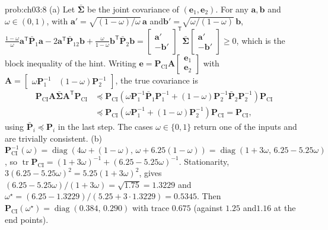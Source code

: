 \documentclass[graybox,envcountchap]{style/SNmono}
\DeclareMathOperator{\diag}{diag}
\DeclareMathOperator{\tr}{tr}
\providecommand{\DIFaddbegin}{} %
\providecommand{\DIFaddend}{} %
\begin{document}
\begin{sol}{prob:ch03:8}
(a) Let $\bar{\boldsymbol{\Sigma}}$ be the joint covariance of $(\mathbf{e}_1,\mathbf{e}_2)$. For any $\mathbf{a},\mathbf{b}$ and\DIFaddbegin \allowbreak \DIFaddend $\omega\in(0,1)$, with $\mathbf{a}'=\sqrt{(1-\omega)/\omega}\,\mathbf{a}$ and\DIFaddbegin \allowbreak \DIFaddend $\mathbf{b}'=\sqrt{\omega/(1-\omega)}\,\mathbf{b}$,
$\tfrac{1-\omega}{\omega}\mathbf{a}^{\mathsf T}\bar{\mathbf{P}}_1\mathbf{a}-2\mathbf{a}^{\mathsf T}\bar{\mathbf{P}}_{12}\mathbf{b}+\tfrac{\omega}{1-\omega}\mathbf{b}^{\mathsf T}\bar{\mathbf{P}}_2\mathbf{b}=\begin{bmatrix}\mathbf{a}'\\-\mathbf{b}'\end{bmatrix}^{\mathsf T}\bar{\boldsymbol{\Sigma}}\begin{bmatrix}\mathbf{a}'\\-\mathbf{b}'\end{bmatrix}\ge0$,
which is the block inequality of the hint. Writing $\mathbf{e}=\mathbf{P}_{\mathrm{CI}}\mathbf{A}\begin{bmatrix}\mathbf{e}_1\\ \mathbf{e}_2\end{bmatrix}$ with $\mathbf{A}=\begin{bmatrix}\omega\mathbf{P}_1^{-1}&(1-\omega)\mathbf{P}_2^{-1}\end{bmatrix}$, the true covariance is
\begin{align*}
\mathbf{P}_{\mathrm{CI}}\mathbf{A}\bar{\boldsymbol{\Sigma}}\mathbf{A}^{\mathsf T}\mathbf{P}_{\mathrm{CI}}
&\preceq\mathbf{P}_{\mathrm{CI}}\left(\omega\mathbf{P}_1^{-1}\bar{\mathbf{P}}_1\mathbf{P}_1^{-1}+(1-\omega)\mathbf{P}_2^{-1}\bar{\mathbf{P}}_2\mathbf{P}_2^{-1}\right)\mathbf{P}_{\mathrm{CI}}\\
&\preceq\mathbf{P}_{\mathrm{CI}}\left(\omega\mathbf{P}_1^{-1}+(1-\omega)\mathbf{P}_2^{-1}\right)\mathbf{P}_{\mathrm{CI}}=\mathbf{P}_{\mathrm{CI}},
\end{align*}
using $\bar{\mathbf{P}}_i\preceq\mathbf{P}_i$ in the last step. The cases $\omega\in\{0,1\}$ return one of the inputs and are trivially consistent.
(b) $\mathbf{P}_{\mathrm{CI}}^{-1}(\omega)=\diag(4\omega+(1-\omega),\,\omega+6.25(1-\omega))=\diag(1+3\omega,\,6.25-5.25\omega)$, so $\tr\mathbf{P}_{\mathrm{CI}}=(1+3\omega)^{-1}+(6.25-5.25\omega)^{-1}$. Stationarity, $3(6.25-5.25\omega)^{2}=5.25(1+3\omega)^{2}$, gives $(6.25-5.25\omega)/(1+3\omega)=\sqrt{1.75}=1.3229$ and\DIFaddbegin \allowbreak \DIFaddend $\omega^{\star}=(6.25-1.3229)/(5.25+3\cdot1.3229)=0.5345$. Then $\mathbf{P}_{\mathrm{CI}}(\omega^{\star})=\diag(0.384,\,0.290)$ with trace $0.675$ (against $1.25$ and\DIFaddbegin \allowbreak \DIFaddend $1.16$ at the end points).

\end{sol}
\end{document}
